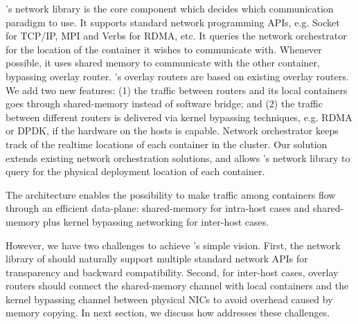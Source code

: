 \sysname's network library is the core component which decides which
communication paradigm to use. It supports standard network programming APIs,
e.g. Socket for TCP/IP, MPI and Verbs for RDMA, etc. It queries the network
orchestrator for the location of the container it wishes to communicate with.
Whenever possible, it uses shared memory to communicate with the other
container, bypassing overlay router.  \sysname's overlay routers are based on
existing overlay routers. We add two new features: (1) the traffic between
routers and its local containers goes through shared-memory instead of software
bridge; and (2) the traffic between different routers is delivered via kernel
bypassing techniques, e.g. RDMA or DPDK, if the hardware on the hosts is
capable.  Network orchestrator keeps track of the realtime locations of each
container in the cluster. Our solution extends existing network orchestration
solutions, and allows \sysname's network library to query for the physical
deployment location of each container. 

The architecture enables the possibility to make traffic among containers flow
through an efficient data-plane: shared-memory for intra-host cases and
shared-memory plus kernel bypassing networking for inter-host cases.

However, we have two challenges to achieve \sysname's simple vision.  First, the
network library of \sysname should naturally support multiple standard network
APIs for transparency and backward compatibility. Second, for inter-host cases,
overlay routers should connect the shared-memory channel with local containers
and the kernel bypassing channel between physical NICs to avoid overhead caused
by memory copying. In next section, we discuss how \sysname addresses these
challenges.

